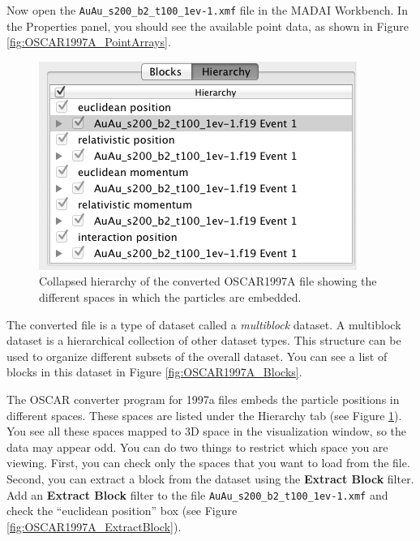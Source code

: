 \documentclass[12pt]{article}
\newcommand{\filter}[1]{\textbf{#1}}
\newcommand{\file}[1]{\texttt{#1}}
\begin{document}
Now open the \texttt{AuAu\_s200\_b2\_t100\_1ev-1.xmf} file in the MADAI Workbench. In the Properties panel, you should see the available point data, as shown in Figure \ref{fig:OSCAR1997A_PointArrays}.


\begin{figure}[htbp]
   \centering
   \includegraphics[scale=.5]{images/OSCAR1997A_HierarchyCollapsed.png} %
   \caption{Collapsed hierarchy of the converted OSCAR1997A file showing the different spaces in which the particles are embedded.}
   \label{fig:OSCAR1997A_HierarchyCollapsed}
\end{figure}

The converted file is a type of dataset called a \emph{multiblock} dataset. A multiblock dataset is a hierarchical collection of other dataset types. This structure can be used to organize different subsets of the overall dataset. You can see a list of blocks in this dataset in Figure \ref{fig:OSCAR1997A_Blocks}.

The OSCAR converter program for 1997a files embeds the particle positions in different spaces. These spaces are listed under the Hierarchy tab (see Figure \ref{fig:OSCAR1997A_HierarchyCollapsed}). You see all these spaces mapped to 3D space in the visualization window, so the data may appear odd. You can do two things to restrict which space you are viewing. First, you can check only the spaces that you want to load from the file. Second, you can extract a block from the dataset using the \filter{Extract Block} filter. Add an \filter{Extract Block} filter to the file \file{AuAu\_s200\_b2\_t100\_1ev-1.xmf} and check the ``euclidean position'' box (see Figure \ref{fig:OSCAR1997A_ExtractBlock}).
\end{document}
